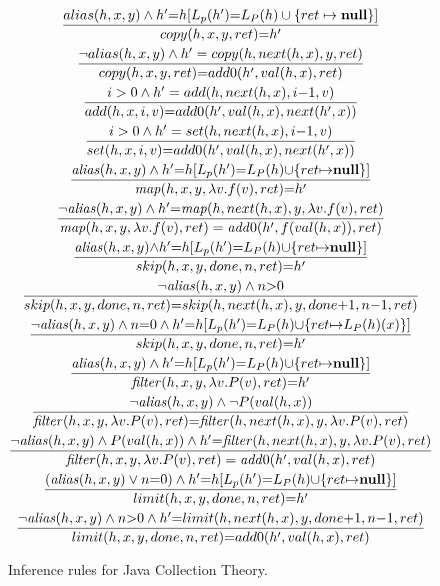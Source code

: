 \documentclass[runningheads,a4paper]{llncs}
\begin{document}
\begin{figure*}\ContinuedFloat
\begin{framed}
\begin{gather}
\frac{alias(h,x,y)\wedge h'{=}h[L_p(h') {=} L_P(h) \cup \{ret\mapsto
\mathbf{null}\}]}{copy(h,x,y,ret) {=} h'}\\
\frac{\neg alias(h,x,y) \wedge h'=copy(h,next(h,x),y,ret)}{copy(h,x,y,ret) {=}
add0(h',val(h,x),ret)}\\
\frac{i>0\wedge h'=add(h,next(h,x),i{-}1,v)}{add(h,x,i,v) {=} 
add0(h',val(h,x),next(h',x))}\\
\frac{i>0 \wedge h'=set(h,next(h,x),i{-}1,v)}{set(h,x,i,v) {=}
add0(h',val(h,x),next(h',x))}\\
\frac{\mathit{alias}(h,x, y)\wedge h'{=}h[L_p(h') {=} L_P(h) {\cup} \{ret{\mapsto}
\mathbf{null}\}]}{\mathit{map}(h,x,y,\lambda v. f(v),ret) {=} h'}\\
\frac{\neg \mathit{alias}(h,x, y) \wedge h'{=}\mathit{map}(h,next(h,x),y,\lambda v.
f(v),ret)}{\mathit{map}(h,x,y,\lambda v. f(v),ret) =  \mathit{add}0(h', f(val(h,x)),ret)}\\
\frac{\mathit{alias}(h,x,y){\wedge} h'{=}h[L_p(h') {=} L_P(h) {\cup} \{ret{\mapsto}
\mathbf{null}\}]}{skip(h,x,y,done,n,ret){=}h'}\\
\frac{\neg\mathit{alias}(h,x,y) \wedge
n{>}0}{skip(h,x,y,done,n,ret){=}skip(h,next(h,x),y,done{+}1,n{-}1,ret)}\\
\frac{\neg \mathit{alias}(h,x,y) \wedge n{=}0 \wedge h'{=}h[L_p(h') {=} L_P(h) {\cup}
\{ret{\mapsto} L_P(h)(x)\}]}{skip(h,x,y,done,n,ret){=}h'}\\
\frac{\mathit{alias}(h,x, y)\wedge h'{=}h[L_p(h') {=} L_P(h) {\cup} \{ret{\mapsto}
\mathbf{null}\}]}{\mathit{filter}(h,x,y,\lambda v. P(v),ret) {=} h'}\\
\frac{\neg \mathit{alias}(h,x, y) \wedge \neg P(val(h,x))}{\mathit{filter}(h,x,y,\lambda v.
P(v),ret) {=}  \mathit{filter}(h,next(h,x),y,\lambda v. P(v),ret)}\\
\frac{\neg \mathit{alias}(h,x, y) \wedge P(val(h,x))\wedge
h'{=}\mathit{filter}(h,next(h,x),y,\lambda v. P(v),ret)}{\mathit{filter}(h,x,y,\lambda v.
P(v),ret) =  \mathit{add}0(h', val(h,x),ret)}\\
\frac{(\mathit{alias}(h,x,y) \vee n{=}0)\wedge h'{=}h[L_p(h') {=} L_P(h) {\cup}
\{ret{\mapsto} \mathbf{null}\}]}{limit(h,x,y,done,n,ret){=}h'}\\
\frac{\neg\mathit{alias}(h,x,y) \wedge n{>}0 \wedge
h'{=}limit(h,next(h,x),y,done{+}1,n{-}1,ret)}{limit(h,x,y,done,n,ret){=}add0(h',val(h,x),ret)}
\end{gather}
\end{framed}
\caption[]{Inference rules for Java Collection Theory.}
\label{fig:JCT-formal}
\end{figure*}
\end{document}
